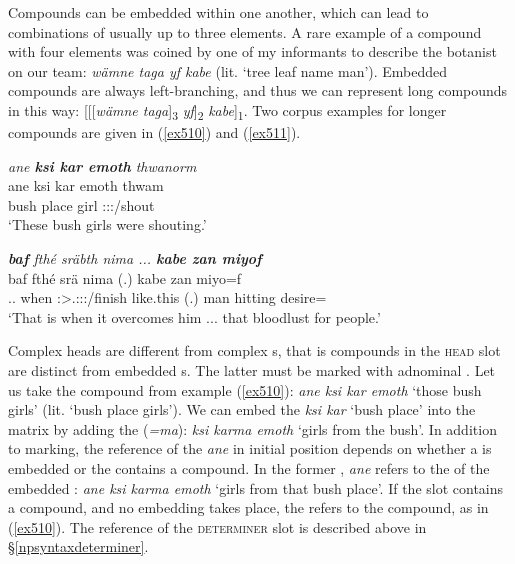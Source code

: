 Compounds can be embedded within one another, which can lead to combinations of usually up to three elements. A rare example of a compound with four elements was coined by one of my informants to describe the botanist on our team: \emph{wämne taga yf kabe} (lit. `tree leaf name man'). Embedded compounds are always left-branching, and thus we can represent long compounds in this way: [[[\emph{wämne taga}]\textsubscript{3} \emph{yf}]\textsubscript{2} \emph{kabe}]\textsubscript{1}. Two corpus examples for longer compounds are given in (\ref{ex510}) and (\ref{ex511}).

\begin{exe}
 	\ex \emph{ane \textbf{ksi kar emoth} thwanorm}\\
 	\gll ane ksi kar emoth thwam\\
 	{\Dem} bush place girl \Stpl:\Sbj:\Pst:\Dur/shout\\
 	\trans `These bush girls were shouting.'
 	\label{ex510}
\end{exe}
\begin{exe}
 	\ex \emph{\textbf{baf} fthé sräbth nima ... \textbf{kabe zan miyof}}\\
 	\gll baf fthé srä nima (.) kabe zan miyo=f\\
 	\Recog.\Erg.{\Sg} when \Stsg:\Sbj>\Tsg.\Masc:\Obj:\Irr:\Pfv/finish like.this (.) man hitting desire=\Erg\\
 	\trans `That is when it overcomes him ... that bloodlust for people.'\\
 	\label{ex511}
\end{exe}

Complex heads are different from complex s, that is compounds in the \textsc{head} slot are distinct from embedded s. The latter must be marked with adnominal . Let us take the compound from example (\ref{ex510}): \emph{ane ksi kar emoth} `those bush girls' (lit. `bush place girls'). We can embed the  \emph{ksi kar} `bush place' into the matrix  by adding the   (\emph{=ma}): \emph{ksi karma emoth} `girls from the bush'. In addition to  marking, the reference of the  \emph{ane} in initial position depends on whether a  is embedded or the  contains a compound. In the former , \emph{ane} refers to the  of the embedded : \emph{ane ksi karma emoth} `girls from that bush place'. If the  slot contains a compound, and no embedding takes place, the  refers to the compound, as in (\ref{ex510}). The reference of the \textsc{determiner} slot is described above in {\S}\ref{npsyntaxdeterminer}.

